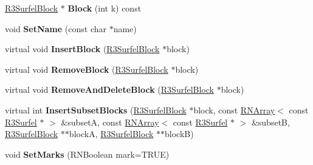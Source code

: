 \begin{DoxyCompactItemize}
\item 
\hyperlink{class_r3_surfel_block}{R3\+Surfel\+Block} $\ast$ {\bfseries Block} (int k) const \hypertarget{class_r3_surfel_database_aef473e7ec542c39680ffde2d49b0c754}{}\label{class_r3_surfel_database_aef473e7ec542c39680ffde2d49b0c754}

\item 
void {\bfseries Set\+Name} (const char $\ast$name)\hypertarget{class_r3_surfel_database_afce39626c6469ac29409e91c80d2b3af}{}\label{class_r3_surfel_database_afce39626c6469ac29409e91c80d2b3af}

\item 
virtual void {\bfseries Insert\+Block} (\hyperlink{class_r3_surfel_block}{R3\+Surfel\+Block} $\ast$block)\hypertarget{class_r3_surfel_database_ae16276217de50da8cb8834b8ee42b851}{}\label{class_r3_surfel_database_ae16276217de50da8cb8834b8ee42b851}

\item 
virtual void {\bfseries Remove\+Block} (\hyperlink{class_r3_surfel_block}{R3\+Surfel\+Block} $\ast$block)\hypertarget{class_r3_surfel_database_ac5973d807291c1d495fe30d42121868b}{}\label{class_r3_surfel_database_ac5973d807291c1d495fe30d42121868b}

\item 
virtual void {\bfseries Remove\+And\+Delete\+Block} (\hyperlink{class_r3_surfel_block}{R3\+Surfel\+Block} $\ast$block)\hypertarget{class_r3_surfel_database_a8e51d7c748adfc8a6a9a787bc43227de}{}\label{class_r3_surfel_database_a8e51d7c748adfc8a6a9a787bc43227de}

\item 
virtual int {\bfseries Insert\+Subset\+Blocks} (\hyperlink{class_r3_surfel_block}{R3\+Surfel\+Block} $\ast$block, const \hyperlink{class_r_n_array}{R\+N\+Array}$<$ const \hyperlink{class_r3_surfel}{R3\+Surfel} $\ast$ $>$ \&subsetA, const \hyperlink{class_r_n_array}{R\+N\+Array}$<$ const \hyperlink{class_r3_surfel}{R3\+Surfel} $\ast$ $>$ \&subsetB, \hyperlink{class_r3_surfel_block}{R3\+Surfel\+Block} $\ast$$\ast$blockA, \hyperlink{class_r3_surfel_block}{R3\+Surfel\+Block} $\ast$$\ast$blockB)\hypertarget{class_r3_surfel_database_a7dae5ce0aed2403fe9301bd5018e7d45}{}\label{class_r3_surfel_database_a7dae5ce0aed2403fe9301bd5018e7d45}

\item 
void {\bfseries Set\+Marks} (R\+N\+Boolean mark=T\+R\+UE)\hypertarget{class_r3_surfel_database_a23bc379821a9350889b4f3259f1989a7}{}\label{class_r3_surfel_database_a23bc379821a9350889b4f3259f1989a7}


\end{DoxyCompactItemize}
